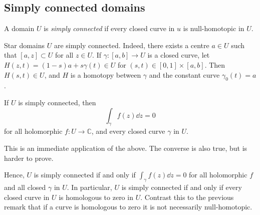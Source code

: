 \subsection{Simply connected domains}
\begin{definition}
	A domain \( U \) is \textit{simply connected} if every closed curve in \( u \) is null-homotopic in \( U \).
\end{definition}
Star domains \( U \) are simply connected.
Indeed, there exists a centre \( a \in U \) such that \( [a,z] \subset U \) for all \( z \in U \).
If \( \gamma \colon [a,b] \to U \) is a closed curve, let \( H(z,t) = (1-s)a + s\gamma(t) \in U \) for \( (s,t) \in [0,1] \times [a,b] \).
Then \( H(s,t) \in U \), and \( H \) is a homotopy between \( \gamma \) and the constant curve \( \gamma_0(t) = a \).
\begin{theorem}
	If \( U \) is simply connected, then
	\[ \int_\gamma f(z) \dd{z} = 0 \]
	for all holomorphic \( f \colon U \to \mathbb C \), and every closed curve \( \gamma \) in \( U \).
\end{theorem}
This is an immediate application of the above.
The converse is also true, but is harder to prove.

Hence, \( U \) is simply connected if and only if \( \int_\gamma f(z) \dd{z} = 0 \) for all holomorphic \( f \) and all closed \( \gamma \) in \( U \).
In particular, \( U \) is simply connected if and only if every closed curve in \( U \) is homologous to zero in \( U \).
Contrast this to the previous remark that if a curve is homologous to zero it is not necessarily null-homotopic.
